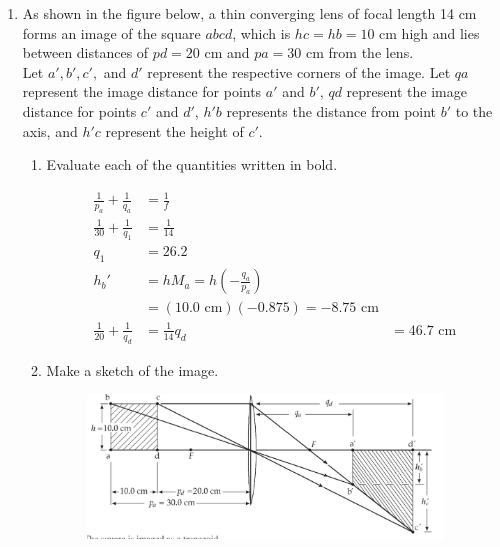 \documentclass{zc-ust-hw}
\begin{document}
\begin{enumerate}
    \newpage
  \item As shown in the figure below, a thin converging lens of focal length 14
    cm forms an image of the square $abcd$, which is $hc = hb = 10$ cm high and
    lies between distances of $pd = 20$ cm and $pa = 30$ cm from the lens. \\
    Let $a', b', c',$ and $d'$ represent the respective corners of the image.  
    Let $qa$ represent the image distance for points $a'$ and $b'$, $qd$ represent 
    the image distance for points $c'$ and $d'$, $h'b$ represents the distance 
    from point $b'$ to the axis, and $h'c$ represent the height of $c'$.
    \begin{enumerate}
      \item Evaluate each of the quantities written in bold.
        \begin{sol}
          \begin{align}
            \frac{1}{p_a}+\frac{1}{q_a}&=\frac{1}{f} \\
            \frac{1}{30}+\frac{1}{q_{1}}&=\frac{1}{14} \\
            q_{1} &= 26.2 \\
            h_b'&=hM_a=h \left( -\frac{q_a}{p_a} \right) \\
            &= (10.0\text{ cm})(-0.875)=-8.75\text{ cm} \\
            \frac{1}{20}+\frac{1}{q_d}&=\frac{1}{14}
            q_d &= 46.7\text{ cm}
          \end{align}
        \end{sol}
      \item Make a sketch of the image.
        \begin{sol}\end{sol}
        \begin{figure}[H]
          \begin{center}
            \includegraphics[width=0.95\textwidth]{figures/1705970086.png}
          \end{center}
          \caption{}
        \end{figure}
        

\end{enumerate}
\end{enumerate}
\end{document}
